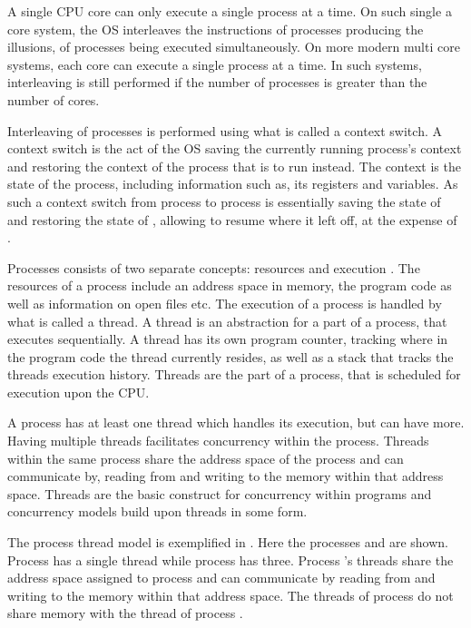 A single \ac{CPU} core can only execute a single process at a time. On such single a core system, the \ac{OS} interleaves the instructions of processes producing the illusions, of processes being executed simultaneously\cite[p. 16]{bryant2011computer}. On more modern multi core systems, each core can execute a single process at a time. In such systems, interleaving is still performed if the number of processes is greater than the number of cores.

Interleaving of processes is performed using what is called a context switch\cite[p. 16]{bryant2011computer}. A context switch is the act of the \ac{OS} saving the currently running process's context and restoring the context of the process that is to run instead. The context is the state of the process, including information such as, its registers and variables\cite[p. 82]{tanenbaum2008modern}. As such a context switch from process  to process  is essentially saving the state of  and restoring the state of , allowing  to resume where it left off, at the expense of .

Processes consists of two separate concepts: resources and execution \cite[p. 98]{tanenbaum2008modern}. The resources of a process include an address space in memory, the program code as well as information on open files etc. The execution of a process is handled by what is called a thread\cite[p. 98]{tanenbaum2008modern}. A thread is an abstraction for a part of a process, that executes sequentially. A thread has its own program counter, tracking where in the program code the thread currently resides, as well as a stack that tracks the threads execution history\cite[p. 99]{tanenbaum2008modern}. Threads are the part of a process, that is scheduled for execution upon the \ac{CPU}.

A process has at least one thread which handles its execution, but can have more. Having multiple threads facilitates concurrency within the process. Threads within the same process share the address space of the process and can communicate by, reading from and writing to the memory within that address space. Threads are the basic construct for concurrency within programs and concurrency models build upon threads in some form.

The process thread model is exemplified in . Here the processes  and  are shown. Process  has a single thread while process  has three. Process 's threads share the address space assigned to process  and can communicate by reading from and writing to the memory within that address space. The threads of process  do not share memory with the thread of process .

